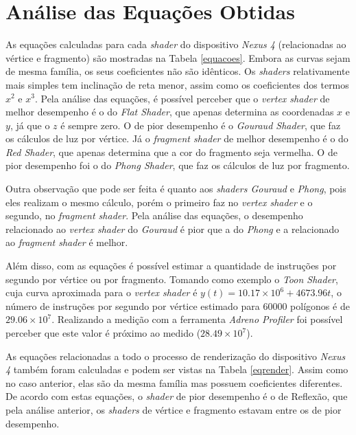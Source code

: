 \section{Análise das Equações Obtidas} 
\label{analieq}	

	As equações calculadas para cada \textit{shader} do dispositivo \textit{Nexus 4} (relacionadas ao vértice e fragmento) são mostradas na Tabela \ref{equacoes}. Embora as curvas sejam de mesma família, os seus coeficientes não são idênticos. Os \textit{shaders} relativamente mais simples tem inclinação de reta menor, assim como os coeficientes dos termos $x^2$ e $x^3$. Pela análise das equações, é possível perceber que o \textit{vertex shader} de melhor desempenho é o do \textit{Flat Shader}, que apenas determina as coordenadas $x$ e $y$, já que o $z$ é sempre zero. O de pior desempenho é o \textit{Gouraud Shader}, que faz os cálculos de luz por vértice. Já o \textit{fragment shader} de melhor desempenho é o do \textit{Red Shader}, que apenas determina que a cor do fragmento seja vermelha. O de pior desempenho foi o do \textit{Phong Shader}, que faz os cálculos de luz por fragmento.

	Outra observação que pode ser feita é quanto aos \textit{shaders Gouraud} e \textit{Phong}, pois eles realizam o mesmo cálculo, porém o primeiro faz no \textit{vertex shader} e o segundo, no \textit{fragment shader}. Pela análise das equações, o desempenho relacionado ao \textit{vertex shader} do \textit{Gouraud} é pior que a do \textit{Phong} e a relacionado ao \textit{fragment shader} é melhor.  

	Além disso, com as equações é possível estimar a quantidade de instruções por segundo por vértice ou por fragmento. Tomando como exemplo o \textit{Toon Shader}, cuja curva aproximada para o \textit{vertex shader} é  $y(t) = 10.17 \times 10^6 + 4673.96t$, o número de instruções por segundo por vértice estimado para 60000 polígonos é de $29.06 \times 10^7$. Realizando a medição com a ferramenta \textit{Adreno Profiler} foi possível perceber que este valor é próximo ao medido ($28.49 \times 10^7$).

	As equações relacionadas a todo o processo de renderização do dispositivo \textit{Nexus 4} também foram calculadas e podem ser vistas na Tabela \ref{eqrender}. Assim como no caso anterior, elas são da mesma família mas possuem coeficientes diferentes. De acordo com estas equações, o \textit{shader} de pior desempenho é o de Reflexão, que pela análise anterior, os \textit{shaders} de vértice e fragmento estavam entre os de pior desempenho. 

